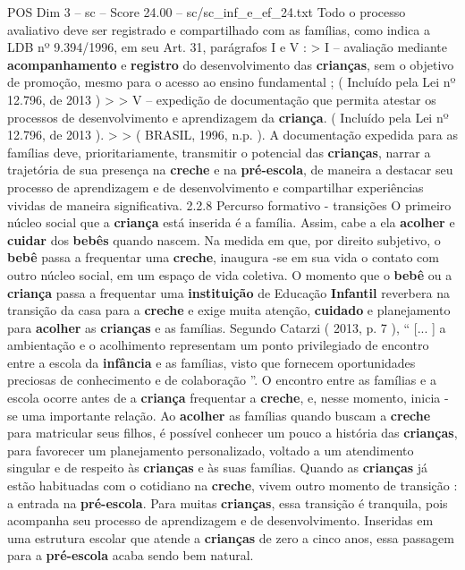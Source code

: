 \begin{textsample}{POS Dim 3 – sc – Score 24.00 – sc/sc\_inf\_e\_ef\_24.txt}
Todo o processo avaliativo deve ser registrado e compartilhado com as famílias, como indica a LDB nº 9.394/1996, em seu Art. 31, parágrafos I e V : > I – avaliação mediante \textbf{acompanhamento} e \textbf{registro} do desenvolvimento das \textbf{crianças}, sem o objetivo de promoção, mesmo para o acesso ao ensino fundamental ; ( Incluído pela Lei nº 12.796, de 2013 ) > > V – expedição de documentação que permita atestar os processos de desenvolvimento e aprendizagem da \textbf{criança}. ( Incluído pela Lei nº 12.796, de 2013 ). > > ( BRASIL, 1996, n.p. ).
A documentação expedida para as famílias deve, prioritariamente, transmitir o potencial das \textbf{crianças}, narrar a trajetória de sua presença na \textbf{creche} e na \textbf{pré-escola}, de maneira a destacar seu processo de aprendizagem e de desenvolvimento e compartilhar experiências vividas de maneira significativa. 2.2.8 Percurso formativo - transições O primeiro núcleo social que a \textbf{criança} está inserida é a família.
Assim, cabe a ela \textbf{acolher} e \textbf{cuidar} dos \textbf{bebês} quando nascem.
Na medida em que, por direito subjetivo, o \textbf{bebê} passa a frequentar uma \textbf{creche}, inaugura -se em sua vida o contato com outro núcleo social, em um espaço de vida coletiva.
O momento que o \textbf{bebê} ou a \textbf{criança} passa a frequentar uma \textbf{instituição} de Educação \textbf{Infantil} reverbera na transição da casa para a \textbf{creche} e exige muita atenção, \textbf{cuidado} e planejamento para \textbf{acolher} as \textbf{crianças} e as famílias.
Segundo Catarzi ( 2013, p. 7 ), “ [... ] a ambientação e o acolhimento representam um ponto privilegiado de encontro entre a escola da \textbf{infância} e as famílias, visto que fornecem oportunidades preciosas de conhecimento e de colaboração ”.
O encontro entre as famílias e a escola ocorre antes de a \textbf{criança} frequentar a \textbf{creche}, e, nesse momento, inicia -se uma importante relação.
Ao \textbf{acolher} as famílias quando buscam a \textbf{creche} para matricular seus filhos, é possível conhecer um pouco a história das \textbf{crianças}, para favorecer um planejamento personalizado, voltado a um atendimento singular e de respeito às \textbf{crianças} e às suas famílias.
Quando as \textbf{crianças} já estão habituadas com o cotidiano na \textbf{creche}, vivem outro momento de transição : a entrada na \textbf{pré-escola}.
Para muitas \textbf{crianças}, essa transição é tranquila, pois acompanha seu processo de aprendizagem e de desenvolvimento.
Inseridas em uma estrutura escolar que atende a \textbf{crianças} de zero a cinco anos, essa passagem para a \textbf{pré-escola} acaba sendo bem natural.

\end{textsample}
